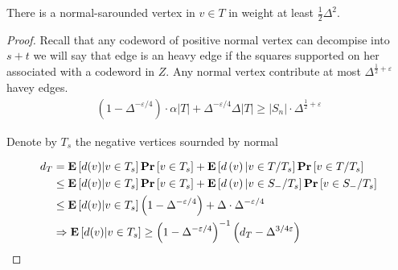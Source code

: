 \begin{claim}
   There is a normal-sarounded vertex in $v \in T$ in weight at least $\frac{1}{2} \Delta^{2}$.   
 \end{claim}
 \begin{proof}
   Recall that any codeword of positive normal vertex can decompise into $s + t$ we will say that edge is an heavy edge if the squares supported on her associated with a codeword in $Z$. Any normal vertex contribute at most $\Delta^{\frac{1}{2}+\varepsilon}$ havey edges. 
   \begin{equation*}
     \begin{split}
       \left( 1 - \Delta^{-\varepsilon/4} \right) \cdot \alpha |T| +  \Delta^{-\varepsilon/4}  \Delta |T| \ge |S_{n}| \cdot \Delta^{\frac{1}{2} + \varepsilon}
     \end{split}
   \end{equation*}
   
   Denote by $T_{s}$ the negative vertices sournded by normal  
  
   \begin{equation*}
     \begin{split}
       d_{T} &= \mathbf{E} \left[ { d(v) | v \in T_{s} } \right] \mathbf{Pr} \left[  v \in T_{s} \right] + \mathbf{E} \left[ {d\left( v \right) | v \in T / T_{s}} \right] \mathbf{Pr} \left[  v \in T / T_{s} \right] \\
       & \le \mathbf{E} \left[ { d(v) | v \in T_{s} } \right] \mathbf{Pr} \left[  v \in T_{s} \right] + \mathbf{E} \left[ {d\left( v \right) | v \in S_{-} / T_{s}} \right] \mathbf{Pr} \left[  v \in S_{-} / T_{s} \right] \\
       & \le \mathbf{E} \left[ { d(v) | v \in T_{s} } \right] \left( 1 - \Delta^{-\varepsilon/4}  \right)  + \Delta \cdot  \Delta^{-\varepsilon/4} \\
      & \Rightarrow  \mathbf{E} \left[ { d(v) | v \in T_{s} } \right] \ge \left(1 - \Delta^{-\varepsilon/4}  \right)^{-1} \left( d_{T} - \Delta^{3/4 \varepsilon} \right)
     \end{split}
   \end{equation*}


 \end{proof}





